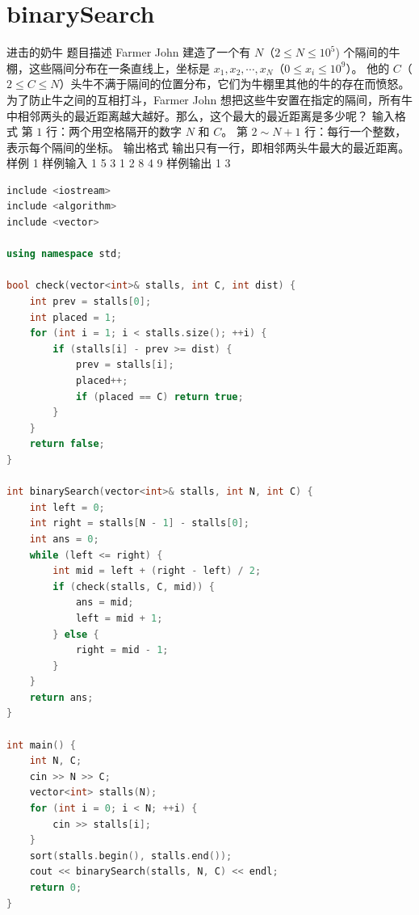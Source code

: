 \documentclass[12pt,twiside,a4paper]{ctexbook}
\numberwithin{chapter}{part}
\begin{document}
\section{binarySearch}
 进击的奶牛
 题目描述
Farmer John 建造了一个有 $N$（$2 \leq N \leq 10 ^ 5$) 个隔间的牛棚，这些隔间分布在一条直线上，坐标是 $x _ 1, x _ 2, \cdots, x _ N$（$0 \leq x _ i \leq 10 ^ 9$）。
他的 $C$（$2 \leq C \leq N$）头牛不满于隔间的位置分布，它们为牛棚里其他的牛的存在而愤怒。为了防止牛之间的互相打斗，Farmer John 想把这些牛安置在指定的隔间，所有牛中相邻两头的最近距离越大越好。那么，这个最大的最近距离是多少呢？
 输入格式
第 $1$ 行：两个用空格隔开的数字 $N$ 和 $C$。
第 $2 \sim N+1$ 行：每行一个整数，表示每个隔间的坐标。
 输出格式
输出只有一行，即相邻两头牛最大的最近距离。
 样例 1
 样例输入 1
5 3
1
2
8
4
9
 样例输出 1
3
\begin{lstlisting}[language=c++,breaklines=true]
include <iostream>
include <algorithm>
include <vector>

using namespace std;

bool check(vector<int>& stalls, int C, int dist) {
    int prev = stalls[0];
    int placed = 1;
    for (int i = 1; i < stalls.size(); ++i) {
        if (stalls[i] - prev >= dist) {
            prev = stalls[i];
            placed++;
            if (placed == C) return true;
        }
    }
    return false;
}

int binarySearch(vector<int>& stalls, int N, int C) {
    int left = 0;
    int right = stalls[N - 1] - stalls[0];
    int ans = 0;
    while (left <= right) {
        int mid = left + (right - left) / 2;
        if (check(stalls, C, mid)) {
            ans = mid;
            left = mid + 1;
        } else {
            right = mid - 1;
        }
    }
    return ans;
}

int main() {
    int N, C;
    cin >> N >> C;
    vector<int> stalls(N);
    for (int i = 0; i < N; ++i) {
        cin >> stalls[i];
    }
    sort(stalls.begin(), stalls.end());
    cout << binarySearch(stalls, N, C) << endl;
    return 0;
}
\end{lstlisting}
\end{document}
